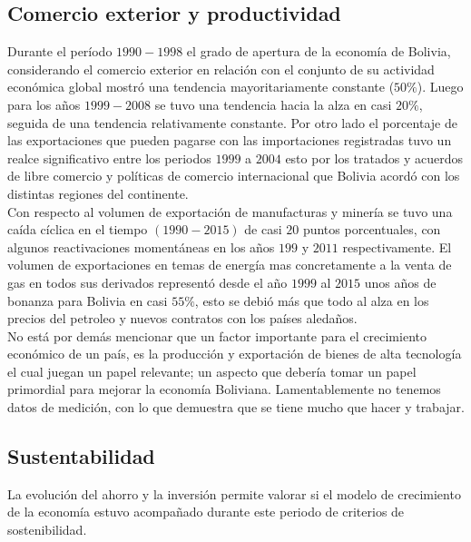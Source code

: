     \subsection{Comercio exterior y productividad}
    Durante el período $1990-1998$ el  grado de apertura de la economía de Bolivia, considerando el comercio exterior en relación con el conjunto de su actividad económica global mostró una tendencia mayoritariamente constante ($50\%$). Luego para los años $1999-2008$ se tuvo una tendencia hacia la alza en casi $20\%$, seguida de una tendencia relativamente constante. Por otro lado el porcentaje de las exportaciones que pueden pagarse con las importaciones registradas tuvo un realce significativo entre los periodos $1999$ a $2004$ esto por los tratados y acuerdos de libre comercio y políticas de comercio internacional que Bolivia acordó con los distintas regiones del continente.\\

    Con respecto al volumen de exportación de manufacturas y minería se tuvo una caída cíclica en el tiempo $(1990-2015)$ de casi $20$ puntos porcentuales, con algunos reactivaciones momentáneas en los años $199$ y $2011$ respectivamente. El volumen de exportaciones en temas de energía mas concretamente a la venta de gas en todos sus derivados representó desde el año $1999$ al $2015$ unos años de bonanza para Bolivia en casi $55\%$, esto se debió más que todo al alza en los precios del petroleo y nuevos contratos con los países aledaños.\\
    No está por demás mencionar que un factor importante para el crecimiento económico de un país, es la producción y  exportación de bienes de alta tecnología el cual juegan un papel relevante; un aspecto que debería tomar un papel primordial para mejorar la economía Boliviana. Lamentablemente no tenemos datos de medición, con lo que demuestra que se tiene mucho que hacer y trabajar.

    \subsection{Sustentabilidad}
    La evolución del ahorro y la inversión permite valorar si el modelo de crecimiento de la economía estuvo acompañado durante este periodo de criterios de sostenibilidad. 

